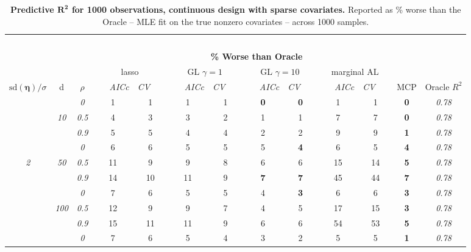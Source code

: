 \begin{table}
\vspace{-.2cm}
\footnotesize
\caption{ 
	{\bf  Predictive $\boldsymbol{R^2}$ for 1000 observations, 
	continuous design with sparse covariates.}
  Reported as  \% worse than the Oracle 
  -- MLE fit on the true nonzero covariates -- 
  across 1000 samples.}
\begin{center}
\begin{tabular}{ccc|cc|cc|cc|cc|c|c}
\hline &&&\multicolumn{9}{|c|}{~}\\[-1ex]
\multicolumn{3}{c}{~}&\multicolumn{9}{|c|}{\bf \% Worse than Oracle } &   \\[1ex]
& &
& \multicolumn{2}{c}{lasso} 
& \multicolumn{2}{c}{GL $\gamma=1$} 
& \multicolumn{2}{c}{GL $\gamma=10$} 
& \multicolumn{2}{c}{marginal AL} 
& \multicolumn{1}{c|}{~} & \\[-0.5ex]
$\mathrm{sd}(\boldsymbol{\eta})/\sigma$ & {\sf d} & $\rho$ 
& ~~~\scriptsize\it AICc & \multicolumn{1}{c}{\scriptsize\it CV~~~}
& ~~~\scriptsize\it AICc & \multicolumn{1}{c}{\scriptsize\it CV~~~}
& ~~~\scriptsize\it AICc & \multicolumn{1}{c}{\scriptsize\it CV~~~}
& ~~~\scriptsize\it AICc & \multicolumn{1}{c}{\scriptsize\it CV~~~} 
& \multicolumn{1}{c|}{ MCP} & Oracle $R^2$ \\[.5ex]
\hline\rule{0pt}{3ex}
& & \it  0  & 1 & 1 & 1 & 1 & {\bf 0} & {\bf 0} & 1 & 1 & {\bf 0} & \it  0.78 \\
 & \it  10  & \it  0.5  & 4 & 3 & 3 & 2 & 1 & 1 & 7 & 7 & {\bf 0} & \it  0.78 \\
& & \it  0.9  & 5 & 5 & 4 & 4 & 2 & 2 & 9 & 9 & {\bf 1} & \it  0.78 \\[1ex]
\cline{2-3}\rule{0pt}{3ex}
& & \it  0  & 6 & 6 & 5 & 5 & 5 & {\bf 4} & 6 & 5 & {\bf 4} & \it  0.78 \\
\it  2  & \it  50  & \it  0.5  & 11 & 9 & 9 & 8 & 6 & 6 & 15 & 14 & {\bf 5} & \it  0.78 \\
& & \it  0.9  & 14 & 10 & 11 & 9 & {\bf 7} & {\bf 7} & 45 & 44 & {\bf 7} & \it  0.78 \\[1ex]
\cline{2-3}\rule{0pt}{3ex}
& & \it  0  & 7 & 6 & 5 & 5 & 4 & {\bf 3} & 6 & 6 & {\bf 3} & \it  0.78 \\
 & \it  100  & \it  0.5  & 12 & 9 & 9 & 7 & 4 & 5 & 17 & 15 & {\bf 3} & \it  0.78 \\
& & \it  0.9  & 15 & 11 & 11 & 9 & 6 & 6 & 54 & 53 & {\bf 5} & \it  0.78 \\[1ex]
\cline{2-3}\rule{0pt}{3ex}
& & \it  0  & 7 & 6 & 5 & 4 & 3 & 2 & 5 & 5 & {\bf 1} & \it  0.78 \\

\end{tabular}
\end{center}
\end{table}
